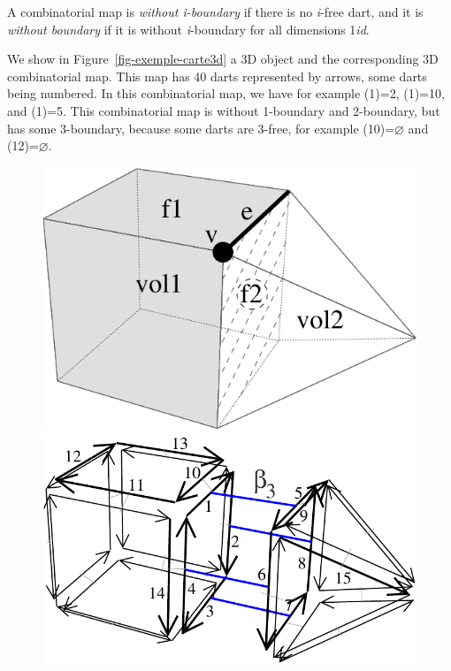 A combinatorial map is \emph{without i-boundary} if there is no
\emph{i}-free dart, and it is \emph{without boundary} if it is without
\emph{i}-boundary for all dimensions 1\myleq{}\emph{i}\myleq{}\emph{d}.


We show in Figure~\ref{fig-exemple-carte3d} a 3D object and the
corresponding 3D combinatorial map.  This map has 40 darts represented
by arrows, some darts being numbered. In this combinatorial map, we
have for example \betaun{}(1)=2, \betadeux{}(1)=10, and
\betatrois{}(1)=5. This combinatorial map is without 1-boundary and
2-boundary, but has some 3-boundary, because some darts are 3-free,
for example \betatrois{}(10)=$\varnothing$ and \betatrois{}(12)=$\varnothing$.
%
\def\LargFig{.4\textwidth}
\begin{figure}
  \begin{ccTexOnly}
    \begin{center}
      \includegraphics[width=\LargFig]{Combinatorial_map/fig/pdf/object3d}\qquad
      \includegraphics[width=\LargFig]{Combinatorial_map/fig/pdf/exemple-carte2-3d}

\end{center}
\end{ccTexOnly}
\end{figure}
